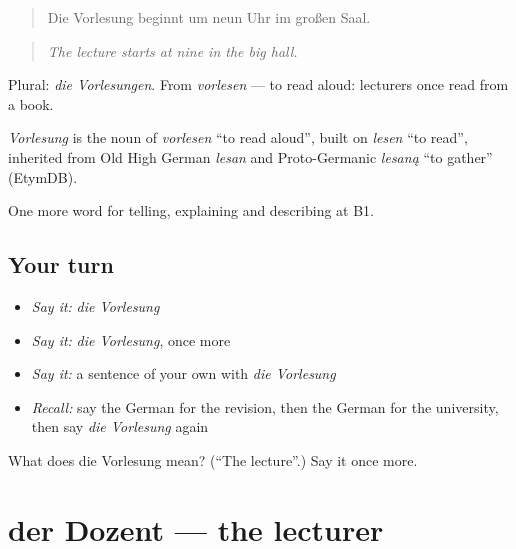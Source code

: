 \begin{quote}
Die Vorlesung beginnt um neun Uhr im großen Saal.
\end{quote}

\begin{quote}
\emph{The lecture starts at nine in the big hall.}
\end{quote}

Plural: \emph{die Vorlesungen}. From \emph{vorlesen} — to read aloud: lecturers once read from a book.

\begin{cousinweb}
\emph{Vorlesung} is the noun of \emph{vorlesen} \textquotedblleft{}to read aloud\textquotedblright{}, built on \emph{lesen} \textquotedblleft{}to read\textquotedblright{}, inherited from Old High German \emph{lesan} and Proto-Germanic \emph{lesaną} \textquotedblleft{}to gather\textquotedblright{} (EtymDB).
\end{cousinweb}

\begin{grammarlens}[title={What you've built}]
One more word for telling, explaining and describing at B1.
\end{grammarlens}

\subsection*{Your turn}
\begin{itemize}
\raggedright
  \item \emph{Say it:} \emph{die Vorlesung}
  \item \emph{Say it:} \emph{die Vorlesung}, once more
  \item \emph{Say it:} a sentence of your own with \emph{die Vorlesung}
  \item \emph{Recall:} say the German for the revision, then the German for the university, then say \emph{die Vorlesung} again
\end{itemize}

\begin{tcolorbox}[breakable,colback=teal!4,colframe=teal!35!black,title={Before you move on}]
What does die Vorlesung mean? (\textquotedblleft{}The lecture\textquotedblright{}.) Say it once more.
\end{tcolorbox}
\section[der Dozent]{der Dozent — the lecturer}

\label{lesson:GE-C377-dozent}




